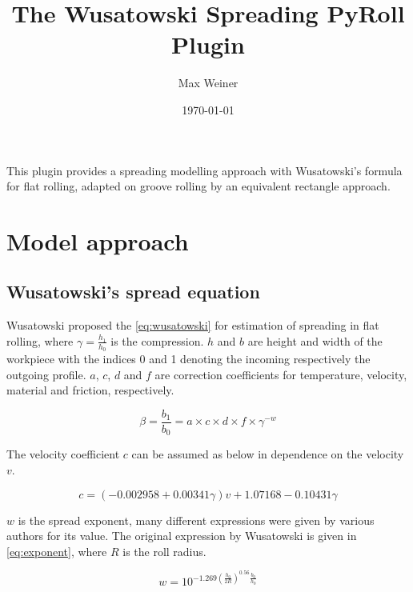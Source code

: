 \documentclass[11pt]{PyRollDocs}
\begin{document}
    \title{The Wusatowski Spreading PyRoll Plugin}
    \author{Max Weiner}
    \date{\today}

    \maketitle

    This plugin provides a spreading modelling approach with Wusatowski's formula for flat rolling, adapted on groove rolling by an equivalent rectangle approach.


    \section{Model approach}\label{sec:model-approach}

    \subsection{Wusatowski's spread equation}\label{subsec:wusatowski's-spread-equation}

    Wusatowski proposed the \autoref{eq:wusatowski} for estimation of spreading in flat rolling,
    where $\gamma = \frac{h_1}{h_0}$ is the compression. $h$ and $b$ are height and width of the workpiece with the indices
    0 and 1 denoting the incoming respectively the outgoing profile. $a$, $c$, $d$ and $f$ are correction
    coefficients for temperature, velocity, material and friction, respectively.

    \begin{equation}
        \beta = \frac{b_1}{b_0} = a \times c \times d \times f \times \gamma^{-w}
        \label{eq:wusatowski}
    \end{equation}

    \noindent The velocity coefficient $c$ can be assumed as below in dependence on the velocity $v$.

    \begin{equation}
        c = \left(-0.002958 + 0.00341 \gamma \right) v + 1.07168 - 0.10431 \gamma
        \label{eq:velocity-coefficient}
    \end{equation}

    $w$ is the spread exponent, many different expressions were given by various authors for its value.
    The original expression by Wusatowski is given in \autoref{eq:exponent}, where $R$ is the roll radius.

    \begin{equation}
        w = 10^{ \num{-1.269} \left( \frac{h_0}{2 R} \right)^{\num{0.56}} \frac{b_0}{h_0} }
        \label{eq:exponent}
    \end{equation}
\end{document}
